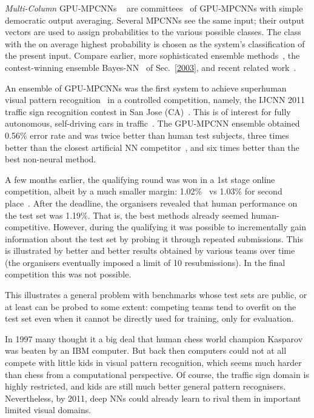 \documentclass[letterpaper]{article}
\begin{document}
\begin{sloppypar}
{\em Multi-Column} GPU-MPCNNs ~\citep{ciresan:2011ijcnn} 
are committees~\citep{breiman:1996,Schapire:90,wolpert:92stacked,hashem:1992,Ueda2000,dietterich2000} of GPU-MPCNNs  with simple democratic output averaging. 
Several MPCNNs see the same input; 
their output vectors are used to assign probabilities to the various possible classes. 
The class with the on average highest probability is chosen as the system's classification of the present input. 
Compare earlier, more sophisticated ensemble methods~\citep{Schapire:90},
the contest-winning ensemble Bayes-NN~\citep{neal2006b}
of Sec.~\ref{2003},
and recent related work~\citep{shao2014}.


An ensemble of GPU-MPCNNs was the first system to achieve
superhuman visual pattern recognition~\citep{ciresan:2011ijcnn,ciresan:2012NN} in a controlled competition, namely,
the IJCNN 2011 traffic sign recognition contest in San Jose (CA)~\citep{stallkamp:11,stallkamp:12}.
This is of interest for fully autonomous, self-driving cars in traffic~\citep[e.g.,][]{Dickmanns:94}.
The GPU-MPCNN ensemble obtained 0.56\% error rate and was twice better
 than human test subjects, 
three times better than the closest artificial NN competitor~\citep{sermanet-ijcnn-11}, and
six times better than the best non-neural method.

A few months earlier, the qualifying round was won in a 1st stage online competition, albeit by a much smaller margin: 1.02\%~\citep{ciresan:2011ijcnn} vs 1.03\% for second place~\citep{sermanet-ijcnn-11}. After the deadline, the organisers revealed that human performance on the test set was 1.19\%. That is, the best methods already seemed human-competitive. However, during the qualifying it was possible to incrementally gain information about the test set by probing it through repeated submissions. This is illustrated by better and better results obtained by various teams over time~\citep{stallkamp:12}
(the organisers eventually imposed a limit of 10 resubmissions). 
In the final competition this was not possible.

This illustrates a general problem with benchmarks whose test sets are public, or at least can be probed
to some extent: competing teams tend to overfit on the test set even when it 
cannot be directly used for training, only for evaluation.

In 1997 many thought it a big deal that human chess world champion Kasparov was beaten by an IBM computer. But back then computers could not at all compete with little kids in visual pattern recognition, which seems much harder than chess from a computational perspective. 
Of course, the traffic sign domain is highly restricted,
and kids are still much better general pattern recognisers.
Nevertheless, by 2011, deep NNs could
 already learn to rival them in important limited visual domains.


\end{sloppypar}
\end{document}
